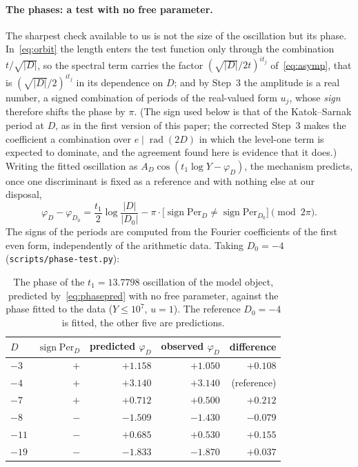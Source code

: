 \documentclass[11pt,a4paper]{article}
\theoremstyle{remark}\newtheorem{remark}[theorem]{Remark}
\begin{document}
\paragraph{The phases: a test with no free parameter.} The sharpest check available to us is not the size of the
oscillation but its phase. In~\eqref{eq:orbit} the length enters the test function only through the combination
$t/\sqrt{|D|}$, so the spectral term carries the factor $(\sqrt{|D|}/2t)^{it_j}$ of~\eqref{eq:asymp}, that is
$(\sqrt{|D|}/2)^{it_j}$ in its dependence on $D$; and by Step~3 the amplitude is a real number, a signed combination of
periods of the real-valued form $u_j$, whose \emph{sign} therefore shifts the phase by $\pi$. (The sign used below is
that of the Katok--Sarnak period at $D$, as in the first version of this paper; the corrected Step~3 makes the
coefficient a combination over $e\mid\operatorname{rad}(2D)$ in which the level-one term is expected to dominate, and
the agreement found here is evidence that it does.) Writing
the fitted oscillation as $A_D\cos(t_1\log Y-\varphi_D)$, the mechanism predicts, once one discriminant is fixed as a
reference and with nothing else at our disposal,
\begin{equation}\label{eq:phasepred}
\varphi_D-\varphi_{D_0}=\frac{t_1}2\log\frac{|D|}{|D_0|}-\pi\cdot\bigl[\operatorname{sign}\mathrm{Per}_D\ne\operatorname{sign}\mathrm{Per}_{D_0}\bigr]\pmod{2\pi}.
\end{equation}
The signs of the periods are computed from the Fourier coefficients of the first even form, independently of the
arithmetic data. Taking $D_0=-4$ (\texttt{scripts/phase-test.py}):

\begin{table}[htbp]
\centering\small
\caption{The phase of the $t_1=13.7798$ oscillation of the model object, predicted by~\eqref{eq:phasepred} with no
free parameter, against the phase fitted to the data ($Y\le10^7$, $u=1$). The reference $D_0=-4$ is fitted, the other
five are predictions.}\label{tab:phases}
\begin{tabular}{lrrrr}
\toprule
$D$ & $\operatorname{sign}\mathrm{Per}_D$ & predicted $\varphi_D$ & observed $\varphi_D$ & difference\\
\midrule
$-3$  & $+$ & $+1.158$ & $+1.050$ & $+0.108$\\
$-4$  & $+$ & $+3.140$ & $+3.140$ & (reference)\\
$-7$  & $+$ & $+0.712$ & $+0.500$ & $+0.212$\\
$-8$  & $-$ & $-1.509$ & $-1.430$ & $-0.079$\\
$-11$ & $-$ & $+0.685$ & $+0.530$ & $+0.155$\\
$-19$ & $-$ & $-1.833$ & $-1.870$ & $+0.037$\\
\bottomrule
\end{tabular}
\end{table}
\end{document}
